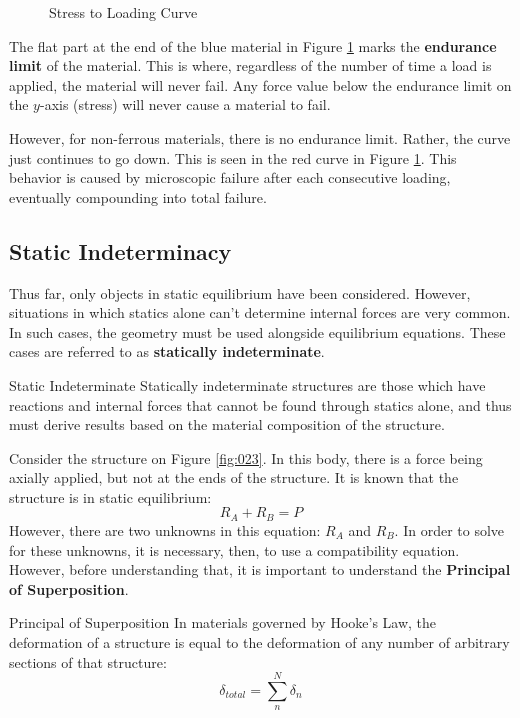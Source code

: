 \documentclass[12pt]{article}
\begin{document}
\begin{figure}[H]
  \centering
  
  \caption{Stress to Loading Curve}
  \label{fig:021}
\end{figure}

The flat part at the end of the blue material in Figure \ref{fig:021} marks the \textbf{endurance limit} of the material. This is where, regardless of the number of time a load is applied, the material will never fail. Any force value below the endurance limit on the $y$-axis (stress) will never cause a material to fail.

However, for non-ferrous materials, there is no endurance limit. Rather, the curve just continues to go down. This is seen in the red curve in Figure \ref{fig:021}. This behavior is caused by microscopic failure after each consecutive loading, eventually compounding into total failure.

\subsection{Static Indeterminacy}
\label{ssec:staticIndeterminacy}

Thus far, only objects in static equilibrium have been considered. However, situations in which statics alone can't determine internal forces are very common. In such cases, the geometry must be used alongside equilibrium equations. These cases are referred to as \textbf{statically indeterminate}.

\begin{definition}{Static Indeterminate}
  Statically indeterminate structures are those which have reactions and internal forces that cannot be found through statics alone, and thus must derive results based on the material composition of the structure.
\end{definition}

Consider the structure on Figure \ref{fig:023}. In this body, there is a force being axially applied, but not at the ends of the structure. It is known that the structure is in static equilibrium:
\begin{equation*}
  R_A+R_B=P
\end{equation*}
However, there are two unknowns in this equation: $R_A$ and $R_B$. In order to solve for these unknowns, it is necessary, then, to use a compatibility equation. However, before understanding that, it is important to understand the \textbf{Principal of Superposition}.
\begin{definition}{Principal of Superposition}
  In materials governed by Hooke's Law, the deformation of a structure is equal to the deformation of any number of arbitrary sections of that structure:
  \begin{equation*}
    \delta_{total} = \sum_{n}^{N} \delta_n
  \end{equation*}
\end{definition}
\end{document}
